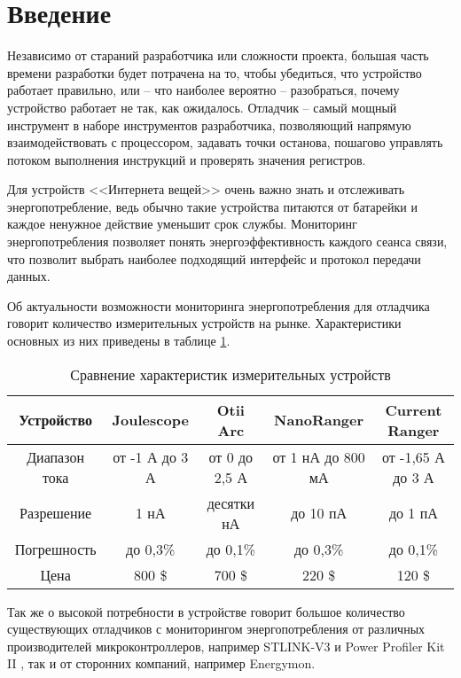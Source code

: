 
\chapter*{Введение}
\hspace{1cm} Независимо от стараний разработчика или сложности проекта, большая часть времени разработки
будет потрачена на то, чтобы убедиться, что устройство работает правильно, или -- что наиболее
вероятно -- разобраться, почему устройство работает не так, как ожидалось. Отладчик -- самый мощный 
инструмент в наборе инструментов разработчика, позволяющий напрямую взаимодействовать с процессором,
задавать точки останова, пошагово управлять потоком выполнения инструкций и проверять  значения
регистров. \cite{Lakamera:embed}

Для устройств <<Интернета вещей>> очень важно знать и отслеживать энергопотребление,
ведь обычно такие устройства питаются от батарейки и каждое ненужное действие уменьшит
срок службы. Мониторинг энергопотребления позволяет понять энергоэффективность каждого сеанса связи,
что позволит выбрать наиболее подходящий интерфейс и протокол передачи данных.

Об актуальности возможности мониторинга энергопотребления для отладчика говорит количество 
измерительных устройств на рынке. Характеристики основных из них приведены в таблице 
\ref{comparemeasdevices}.

\begin{table}[H]
    \caption{Сравнение характеристик измерительных устройств}
    \label{comparemeasdevices}   
    \begin{center}
    \begin{tabular}{|c|c|c|c|c|}
    \hline
  Устройство & Joulescope & Otii Arc & NanoRanger & Current Ranger \\ \hline
    Диапазон тока & от -1 А до 3 А & от 0 до 2,5 А & от 1 нА до 800 мА & от -1,65 А до 3 А \\ \hline
    Разрешение & 1 нА & десятки нА & до 10 пА & до 1 пА  \\ \hline
    Погрешность & до 0,3\% & до 0,1\% & до 0,3\% & до 0,1\% \\ \hline
    Цена & 800 \$ & 700 \$ & 220 \$ & 120 \$  \\ \hline
    \end{tabular}
    \end{center}
\end{table} 

Так же о высокой потребности в устройстве говорит большое количество существующих отладчиков с 
мониторингом энергопотребления от различных производителей микроконтроллеров, например STLINK-V3 
\cite{STLINKV3} и Power Profiler Kit II \cite{Power Profiler Kit}, так и от сторонних компаний, например 
Energymon.

